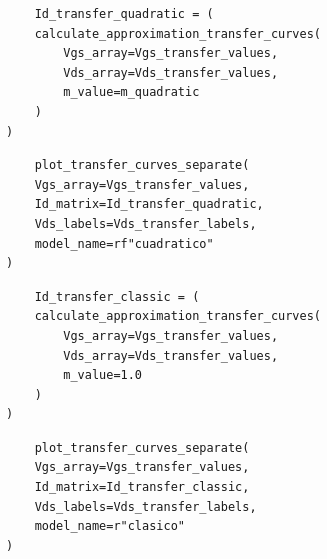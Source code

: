 \documentclass[a4paper, twoside, 10pt, spanish]{article}
\numberwithin{table}{section}
\begin{document}
\begin{verbatim}
    Id_transfer_quadratic = (
    calculate_approximation_transfer_curves(
        Vgs_array=Vgs_transfer_values,
        Vds_array=Vds_transfer_values,
        m_value=m_quadratic
    )
)
\end{verbatim}

\begin{verbatim}
    plot_transfer_curves_separate(
    Vgs_array=Vgs_transfer_values,
    Id_matrix=Id_transfer_quadratic,
    Vds_labels=Vds_transfer_labels,
    model_name=rf"cuadratico"
)
\end{verbatim}

\begin{verbatim}
    Id_transfer_classic = (
    calculate_approximation_transfer_curves(
        Vgs_array=Vgs_transfer_values,
        Vds_array=Vds_transfer_values,
        m_value=1.0
    )
)
\end{verbatim}

\begin{verbatim}
    plot_transfer_curves_separate(
    Vgs_array=Vgs_transfer_values,
    Id_matrix=Id_transfer_classic,
    Vds_labels=Vds_transfer_labels,
    model_name=r"clasico"
)
\end{verbatim}
\end{document}
